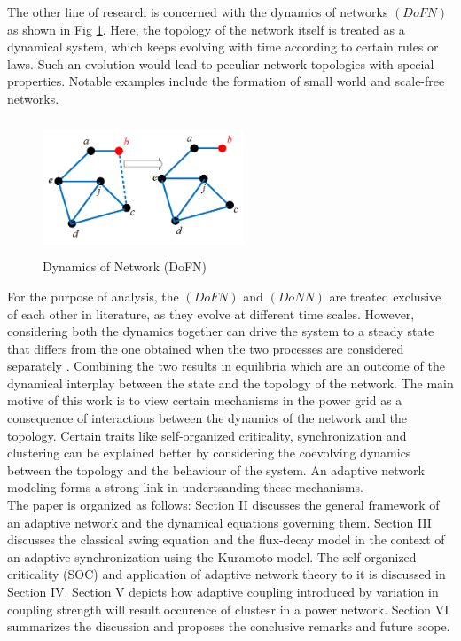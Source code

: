 \documentclass{ifacconf}
\begin{document}
The other line of research is concerned with the dynamics of networks $ (DoFN) $ as shown in Fig \ref {fig:1}. Here, the topology of the network itself is treated as a dynamical system, which keeps evolving with time according to certain rules or laws. Such an evolution would lead to peculiar network topologies with special properties. Notable examples include the formation of small world and scale-free networks.\\
\begin{figure}[h!]
\begin{center}
\includegraphics[width=6cm,height=4cm]{fig1.png}
\caption{Dynamics of Network (DoFN)}
\label{fig:1}
\end{center}
\end{figure}
For the purpose of analysis, the $(DoFN)$ and $(DoNN)$ are treated exclusive of each other in literature, as they evolve at different time scales. However, considering both the dynamics together can drive the system to a steady state that differs from the one obtained when the two processes are considered separately \citep{Cap}. Combining the two results in equilibria which are an outcome of the dynamical interplay between the state and the topology of the network. The main motive of this work is to view certain mechanisms in the power grid as a consequence of interactions between the dynamics of the network and the topology. Certain traits like self-organized criticality, synchronization and clustering can be explained better by considering the coevolving dynamics between the topology and the behaviour of the system. An adaptive network modeling forms a strong link in undertsanding these mechanisms. \\
The paper is organized as follows: Section II discusses the general framework of an adaptive network and the dynamical equations governing them. Section III  discusses the classical swing equation and the flux-decay model in the context of an adaptive synchronization using the Kuramoto model. The self-organized criticality (SOC) and application of adaptive network theory to it is discussed in Section IV. Section V depicts how adaptive coupling introduced by variation in coupling strength will result occurence of clustesr in a power network.
Section VI summarizes the discussion and proposes the conclusive remarks and future scope.\\
\end{document}
